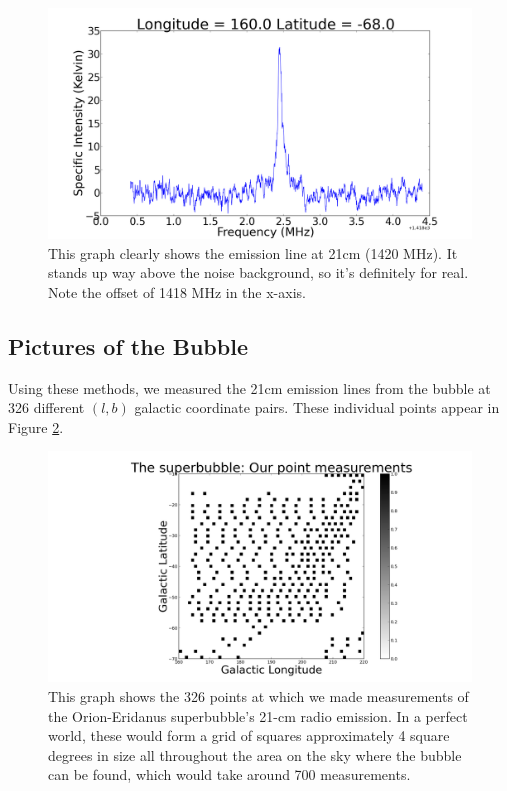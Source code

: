 \documentclass[11pt]{article}
\begin{document}
\begin{figure}
\centering
\includegraphics[scale=0.35]{garphs/specint}
\caption{This graph clearly shows the emission line at 21cm (1420 MHz). It stands up way above the noise background, so it's definitely for real. Note the offset of 1418 MHz in the x-axis.\label{21cm}}
\end{figure} 

\subsection{Pictures of the Bubble}
Using these methods, we measured the 21cm emission lines from the bubble at 326 different $(l, b)$ galactic coordinate pairs. These individual points appear in Figure \ref{points}.

\begin{figure}
\centering
\includegraphics[scale=0.35]{garphs/points}
\caption{This graph shows the 326 points at which we made measurements of the Orion-Eridanus superbubble's 21-cm radio emission. In a perfect world, these would form a grid of squares approximately 4 square degrees in size all throughout the area on the sky where the bubble can be found, which would take around 700 measurements. \label{points}}
\end{figure} 
\end{document}
